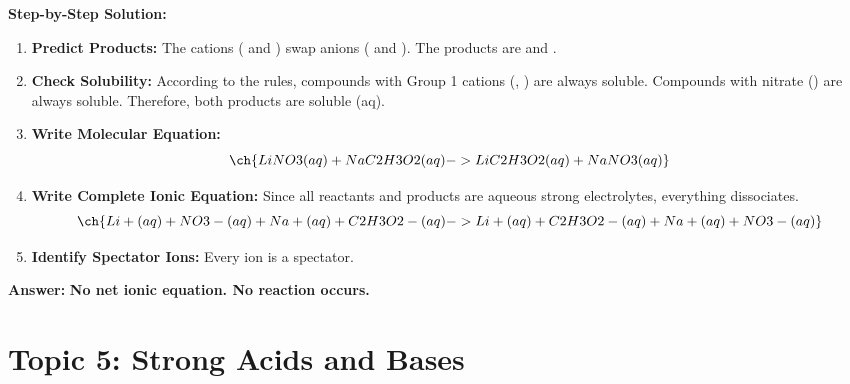 \documentclass{article}
\begin{document}
\textbf{Step-by-Step Solution:}
\begin{enumerate}
    \item \textbf{Predict Products:} The cations ( and ) swap anions ( and ). The products are  and .
    \item \textbf{Check Solubility:} According to the rules, compounds with Group 1 cations (, ) are always soluble. Compounds with nitrate () are always soluble. Therefore, both products are soluble (aq).
    \item \textbf{Write Molecular Equation:}
    \[ \ch{LiNO3(aq) + NaC2H3O2(aq) -> LiC2H3O2(aq) + NaNO3(aq)} \]
    \item \textbf{Write Complete Ionic Equation:} Since all reactants and products are aqueous strong electrolytes, everything dissociates.
    \[ \ch{Li+(aq) + NO3-(aq) + Na+(aq) + C2H3O2-(aq) -> Li+(aq) + C2H3O2-(aq) + Na+(aq) + NO3-(aq)} \]
    \item \textbf{Identify Spectator Ions:} Every ion is a spectator.
\end{enumerate}

\textbf{Answer:} \textbf{No net ionic equation. No reaction occurs.}

\section{Topic 5: Strong Acids and Bases}
\end{document}
